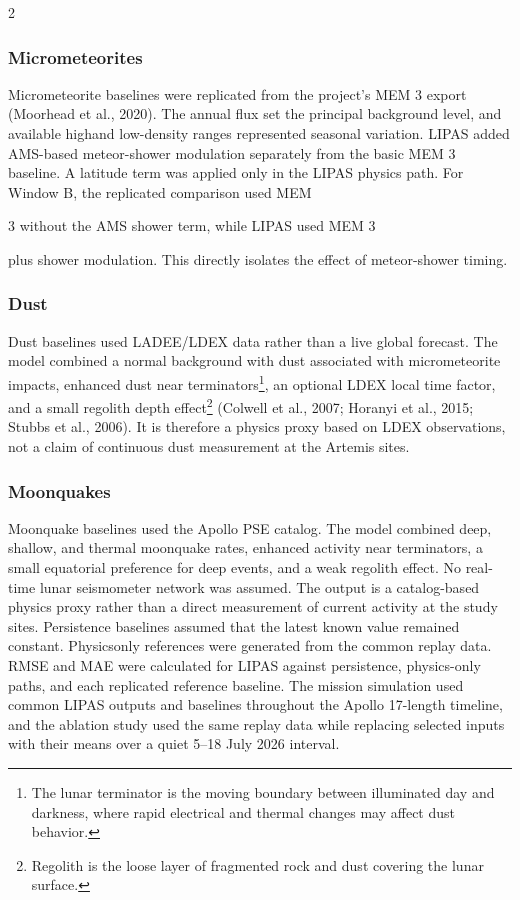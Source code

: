 \begin{multicols*}{2}
\subsubsection{Micrometeorites}

Micrometeorite baselines were replicated from the project's MEM 3 export (Moorhead et al., 2020). The annual flux set the principal background level, and available highand low-density ranges represented seasonal variation. LIPAS added AMS-based meteor-shower modulation separately from the basic MEM 3 baseline. A latitude term was applied only in the LIPAS physics path. For Window B, the replicated comparison used MEM

3 without the AMS shower term, while LIPAS used MEM 3

plus shower modulation. This directly isolates the effect of meteor-shower timing.

\subsubsection{Dust}

Dust baselines used LADEE/LDEX data rather than a live global forecast. The model combined a normal background with dust associated with micrometeorite impacts, enhanced dust near terminators\footnote{The lunar terminator is the moving boundary between illuminated day and darkness, where rapid electrical and thermal changes may affect dust behavior.}, an optional LDEX local time factor, and a small regolith depth effect\footnote{Regolith is the loose layer of fragmented rock and dust covering the lunar surface.} (Colwell et al., 2007; Horanyi et al., 2015; Stubbs et al., 2006). It is therefore a physics proxy based on LDEX observations, not a claim of continuous dust measurement at the Artemis sites.

\subsubsection{Moonquakes}

Moonquake baselines used the Apollo PSE catalog. The model combined deep, shallow, and thermal moonquake rates, enhanced activity near terminators, a small equatorial preference for deep events, and a weak regolith effect. No real-time lunar seismometer network was assumed. The output is a catalog-based physics proxy rather than a direct measurement of current activity at the study sites. Persistence baselines assumed that the latest known value remained constant. Physicsonly references were generated from the common replay data. RMSE and MAE were calculated for LIPAS against persistence, physics-only paths, and each replicated reference baseline. The mission simulation used common LIPAS outputs and baselines throughout the Apollo 17-length timeline, and the ablation study used the same replay data while replacing selected inputs with their means over a quiet 5--18 July 2026 interval.

\end{multicols*}
